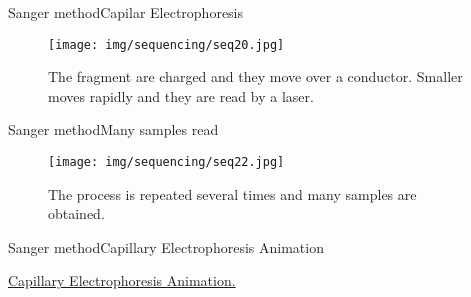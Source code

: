 \documentclass[10pt]{beamer}
\newcommand{\1}{
	\setbeamertemplate{background}{
		\texttt{[image: img/1]}
		\tikz[overlay] \fill[fill opacity=0.75,fill=white] (0,0) rectangle (-\paperwidth,\paperheight);
	}
}
\begin{document}
\begin{frame}{Sanger method}{Capilar Electrophoresis}
	\begin{figure}[]
		\centering
		\texttt{[image: img/sequencing/seq20.jpg]}
		\label{img:mot2}
		\caption{The fragment are charged and they move over a conductor. Smaller moves rapidly and they are read by a laser.}
	\end{figure}
\end{frame}

\begin{frame}{Sanger method}{Many samples read}
	\begin{figure}[]
		\centering
		\texttt{[image: img/sequencing/seq22.jpg]}
		\label{img:mot2}
		\caption{The process is repeated several times and many samples are obtained.}
	\end{figure}
\end{frame}



\begin{frame}{Sanger method}{Capillary Electrophoresis Animation}
	\begin{block}{}
		\href{https://www.youtube.com/watch?v=wdS3j0TgbjM&list=PLgM5s3vRHCgejiz7lKLR318mXs0ox4NFC&index=6&t=0s}{Capillary Electrophoresis Animation.}
		
	\end{block}
\end{frame}
\end{document}
